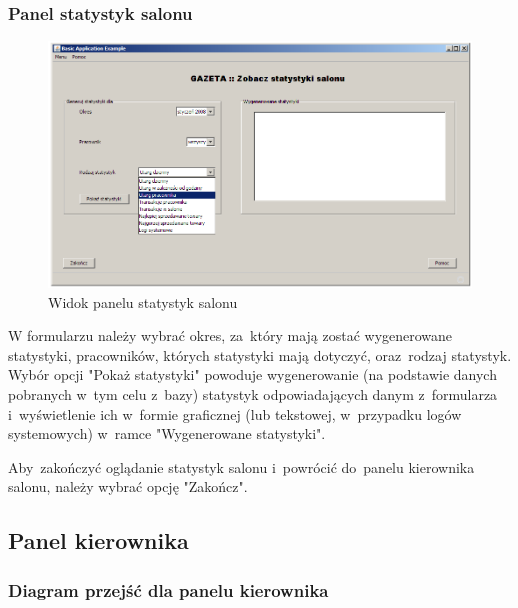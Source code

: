 \subsubsection{Panel statystyk salonu}
\begin{figure}[h]
\begin{center}
\includegraphics[width=20cm,angle=90,keepaspectratio]{gfx/stat_salonu.png}
\end{center}
\caption{Widok panelu statystyk salonu}
\end{figure}
W formularzu należy wybrać okres, za~który mają zostać wygenerowane statystyki, pracowników, których statystyki mają dotyczyć, oraz~rodzaj statystyk. Wybór opcji "Pokaż statystyki" powoduje wygenerowanie (na podstawie danych pobranych w~tym celu z~bazy) statystyk odpowiadających danym z~formularza i~wyświetlenie ich w~formie graficznej (lub tekstowej, w~przypadku logów systemowych) w~ramce "Wygenerowane statystyki".

Aby~zakończyć oglądanie statystyk salonu i~powrócić do~panelu kierownika salonu, należy wybrać opcję "Zakończ".
\clearpage
\subsection{Panel kierownika}
\subsubsection{Diagram przejść dla panelu kierownika}
\clearpage

